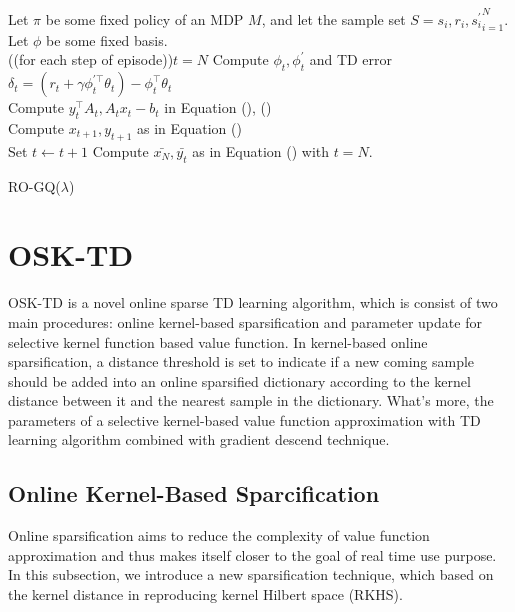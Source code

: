 \documentclass[conference]{IEEEtran}
\makeatletter
\newcommand{\removelatexerror}{\let\@latex@error\@gobble}
\newcommand{\dosemic}{\renewcommand{\@endalgocfline}{\algocf@endline}}%
\newcommand{\pushline}{\Indp}%
\let\oldnl\nl%
\newcommand{\nonl}{\renewcommand{\nl}{\let\nl\oldnl}}%
\makeatother
\begin{document}
{
	\removelatexerror%
	\LinesNumbered
	\begin{algorithm}[H]
		\pushline\dosemic\nonl \textup{Let $\pi$ be some fixed policy of an MDP $M$, and let the sample set $S={s_i, r_i, s_i^{'}}_{i=1}^N$. Let $\phi$ be some fixed basis.}\\

		\Repeat({(for each step of episode)}){$t=N$}{
	  		\textup{Compute $\phi_t, \phi_t^{'}$ and TD error $\delta_t=(r_t+\gamma\phi_t^{'\top}\theta_t)-\phi_t^\top\theta_t$}\\
	  		\textup{Compute $y_t^\top A_t, A_tx_t-b_t$ in Equation (), ()}\\
			\textup{Compute $x_{t+1}, y_{t+1}$ as in Equation ()}\\
			\textup{Set $t\leftarrow t+1$}
  		}
  		\textup{Compute $\bar{x_N}, \bar{y_t}$ as in Equation () with $t=N$}.
 		\caption{RO-GQ($\lambda$)}
	\end{algorithm}
}
\newpage
\section{OSK-TD}
OSK-TD is a novel online sparse TD learning algorithm, which is consist of two main procedures: online kernel-based sparsification and parameter update for selective kernel function based value function. In kernel-based online sparsification, a distance threshold is set to indicate if a new coming sample should be added into an online sparsified dictionary according to the kernel distance between it and the nearest sample in the dictionary. What's more, the parameters of a selective kernel-based value function  approximation with TD learning algorithm combined with gradient descend technique. 
\subsection{Online Kernel-Based Sparcification}
Online sparsification aims to reduce the complexity of value function approximation and thus makes itself closer to the goal of real time use purpose. In this subsection, we introduce a new sparsification technique, which based on the kernel distance in reproducing kernel Hilbert space (RKHS).\\
\end{document}
